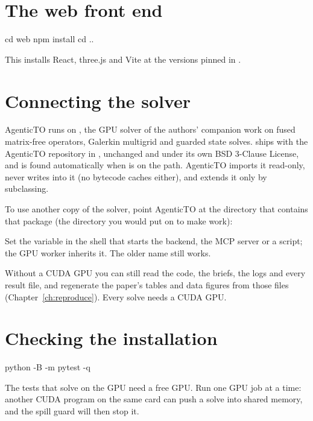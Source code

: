\section{The web front end}
\begin{shell}
cd web
npm install
cd ..
\end{shell}
This installs React, three.js and Vite at the versions pinned in .

\section{Connecting the solver}\label{sec:voxfem}
AgenticTO runs on , the GPU solver of the authors' companion work on fused matrix-free operators,
Galerkin multigrid and guarded state solves.  ships with the AgenticTO repository in , unchanged and
under its own BSD 3-Clause License, and is found automatically when  is on the path. AgenticTO imports it read-only, never writes into
it (no bytecode caches either), and extends it only by subclassing.

To use another copy of the solver, point AgenticTO at the directory that contains that  package (the
directory you would put on  to make  work):


Set the variable in the shell that starts the backend, the MCP server or a script; the GPU worker inherits it.
The older name  still works.

\begin{warnbox}
Without a CUDA GPU you can still read the code, the briefs, the logs and every result file, and regenerate the
paper's tables and data figures from those files (Chapter~\ref{ch:reproduce}). Every solve needs a CUDA GPU.
\end{warnbox}

\section{Checking the installation}
\begin{shell}
python -B -m pytest -q
\end{shell}
The tests that solve on the GPU need a free GPU. Run one GPU job at a time: another CUDA program on the
same card can push a solve into shared memory, and the spill guard will then stop it.

